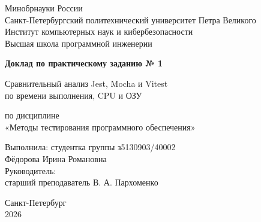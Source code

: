 \documentclass[a4paper,14pt]{extarticle}
\begin{document}
\begin{titlepage}
\centering
Минобрнауки России\\
Санкт-Петербургский политехнический университет Петра Великого\\
Институт компьютерных наук и кибербезопасности\\
Высшая школа программной инженерии
\vfill
{\Large\bfseries Доклад по практическому заданию № 1\par}
\vspace{8mm}
{\Large Сравнительный анализ Jest, Mocha и Vitest\\по времени выполнения, CPU и ОЗУ\par}
\vspace{8mm}
по дисциплине\\«Методы тестирования программного обеспечения»
\vfill
\begin{flushright}
Выполнила: студентка группы з5130903/40002\\
Фёдорова Ирина Романовна\\[8mm]
Руководитель:\\старший преподаватель В. А. Пархоменко
\end{flushright}
\vfill Санкт-Петербург\\2026
\end{titlepage}
\begingroup\small{}\tableofcontents\endgroup
\clearpage\label{body-start}

\clearpage
\printbibliography[heading=bibintoc,title={Список использованных источников}]
\end{document}
